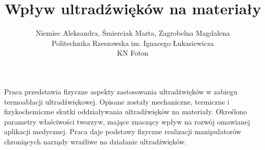 \documentclass[12pt, a4paper]{article}
\begin{document}
\title{Wpływ ultradźwięków na materiały}
\author{Niemiec Aleksandra, Śmierciak Marta, Zagrobelna Magdalena \\Politechnika Rzeszowska im. Ignacego Łukasiewicza\\ KN Foton}
\date {}
\maketitle
\thispagestyle{title}
Praca przedstawia fizyczne aspekty zastosowania ultradźwięków w zabiegu termoablacji ultradźwiękowej. Opisane zostały mechaniczne, termiczne i fizykochemiczne skutki oddziaływania ultradźwięków na materiały. Określono parametry właściwości tworzyw, mające znaczący wpływ na rozwój omawianej aplikacji medycznej. Praca daje podstawy fizyczne realizacji manipulatorów chroniących narządy wrażliwe na działanie ultradźwięków.
\end{document}
